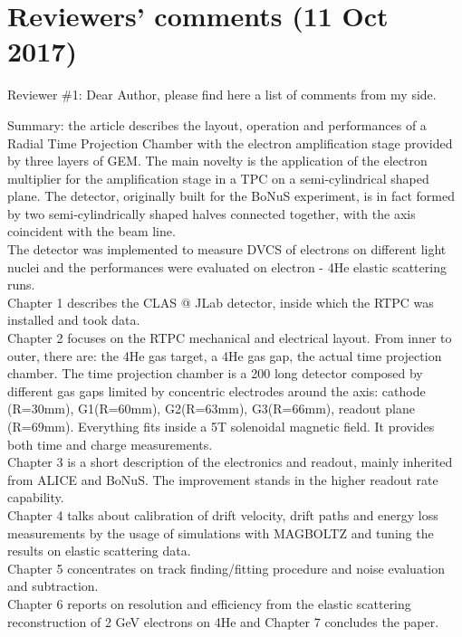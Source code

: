 \documentclass[a4paper,11pt,twoside]{article}
\date{\today}
\begin{document}
\section*{Reviewers' comments (11 Oct 2017)}

Reviewer \#1: Dear Author, please find here a list of comments from my side.

Summary: the article describes the layout, operation and performances of a Radial Time Projection Chamber with the electron amplification stage provided by three layers of GEM. The main novelty is the application of the electron multiplier for the amplification stage in a TPC on a semi-cylindrical shaped plane. The detector, originally built for the BoNuS experiment, is in fact formed by two semi-cylindrically shaped halves connected together, with the axis coincident with the beam line.\\
 
The detector was implemented to measure DVCS of electrons on different light nuclei and the performances were evaluated on electron - 4He elastic scattering runs.\\

Chapter 1 describes the CLAS @ JLab detector, inside which the RTPC was installed and took data.\\ 
Chapter 2 focuses on the RTPC mechanical and electrical layout. From inner to outer, there are: the 4He gas target, a 4He gas gap, the actual time projection chamber. The time projection chamber is a 200 long detector composed by different gas gaps limited by concentric electrodes around the axis: cathode (R=30mm), G1(R=60mm), G2(R=63mm), G3(R=66mm), readout plane (R=69mm). Everything fits inside a 5T solenoidal magnetic field. It provides both time and charge measurements.\\
Chapter 3 is a short description of the electronics and readout, mainly inherited from ALICE and BoNuS. The improvement stands in the higher readout rate capability.\\
Chapter 4 talks about calibration of drift velocity, drift paths and energy loss measurements by the usage of simulations with MAGBOLTZ and tuning the results on elastic scattering data.\\
Chapter 5 concentrates on track finding/fitting procedure and noise evaluation and subtraction.\\
Chapter 6 reports on resolution and efficiency from the elastic scattering reconstruction of 2 GeV electrons on 4He and Chapter 7 concludes the paper.\\
\end{document}
